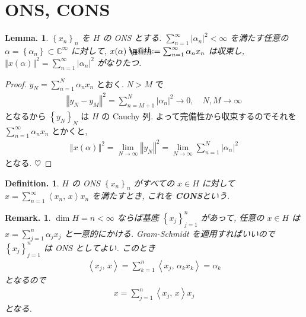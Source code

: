 \documentclass[openany, a4paper, oneside]{book}
\makeatletter
\newcommand*{\defeq}{\mathrel{\rlap{%
\raisebox{0.3ex}{$\m@th\cdot$}}%
\raisebox{-0.3ex}{$\m@th\cdot$}}%
=}
\theoremstyle{break}
\newtheorem{lem}[thm]{Lemma.}
\theoremstyle{breakdefn}
\newtheorem{defn}[thm]{Definition.}
\newtheorem{rem}[thm]{Remark.}
\newcommand{\abs}[1]{\left|#1\right|}
\newcommand{\norm}[1]{\left\Vert#1\right\Vert}
\newcommand{\rbk}[1]{\left (#1\right)}
\newcommand{\cbk}[1]{\left\{#1\right\}}
\newcommand{\bkt}[2]{\left\langle#1,\,#2\right\rangle}
\newcommand{\bbC}{\mathbb{C}}
\newcommand{\upbf}[1]{\textup{\textbf{#1}}}
\makeatother
\begin{document}
\section{ONS, CONS}
\label{sec-7-13-4}

\begin{lem}\label{functional_analysis_hilbert_space_yukimi_7}
 $\cbk{x_{n}}_{n}$ を $H$ の ONS とする.
 $\sum_{n = 1}^\infty \abs{\alpha_{n}}^2 < \infty$ を満たす任意の
 $\alpha = \cbk{\alpha_{n}} \subset \bbC^{\infty}$ に対して,
 $x (\alpha) \defeq \sum_{n = 1}^\infty \alpha_{n}x_{n}$ は収束し,
 $\norm{x \rbk{\alpha}}^2 = \sum_{n=1}^\infty \abs{\alpha_{n}}^2$ がなりたつ.
\end{lem}
\begin{proof}
$y_{N} = \sum_{n=1}^N \alpha_{n} x_{n}$ とおく.
$N > M$ で
\begin{align}
 \norm{y_N - y_M}^2
 =
 \sum_{n = M+1}^N \abs{\alpha_n}^2
 \to 0, \quad N, M \to \infty
\end{align}
となるから $\cbk{y_N}_N$ は $H$ の Cauchy 列.
よって完備性から収束するのでそれを $\sum_{n=1}^\infty \alpha_n x_n$ とかくと,
\begin{align}
 \norm{x \rbk{\alpha}}^2
 =
 \lim_{N \to \infty} \norm{y_N}^2
 =
 \lim_{N \to \infty} \sum_{n=1}^N \abs{\alpha_{n}}^2
\end{align}
となる.
$\heartsuit$
\end{proof}

\begin{defn}
 $H$ の ONS $\cbk{x_{n}}_n$ がすべての $x \in H$ に対して $x = \sum_{n = 1}^\infty \bkt{{x_n}}{x} x_n$ を満たすとき,
 これを \upbf{CONS}という.
\end{defn}
\begin{rem}
 $\dim H = n < \infty$ ならば基底 $\cbk{x_{j}}_{j=1}^n$ があって,
 任意の $x \in H$ は $x = \sum_{j = 1}^n \alpha_j x_j$ と一意的にかける.
 Gram-Schmidt を適用すればいいので $\cbk{x_{j}}_{j=1}^n$ は ONS としてよい.
 このとき
 \begin{align}
  \bkt{x_j}{x}
  =
  \sum_{k=1}^n \bkt{x_j}{\alpha_k x_k}
  =
  \alpha_k
 \end{align}
 となるので
 \begin{align}
  x
  =
  \sum_{j = 1}^n \bkt{x_j}{x} x_j
 \end{align}
 となる.
\end{rem}
\end{document}
